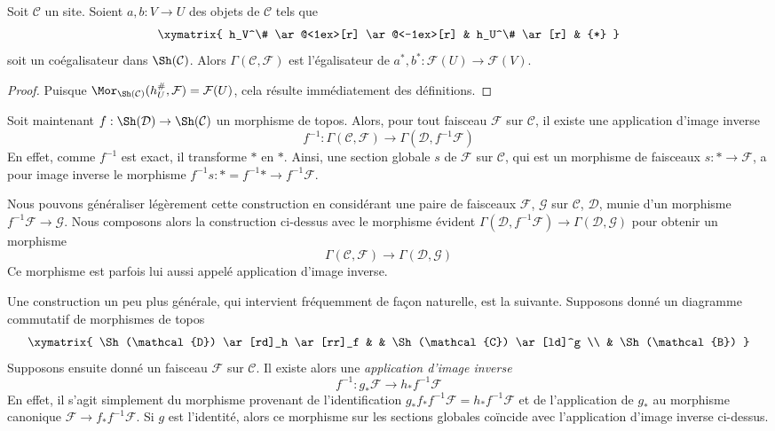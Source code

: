 \begin{lemma}
\label{lemma-compute-global-sections}
Soit $\mathcal{C}$ un site. Soient $a, b : V \to U$ des objets de $\mathcal{C}$
tels que
$$
\xymatrix{
h_V^\# \ar@<1ex>[r] \ar@<-1ex>[r] & h_U^\# \ar[r] & {*}
}
$$
soit un coégalisateur dans $\Sh(\mathcal{C})$. Alors
$\Gamma(\mathcal{C}, \mathcal{F})$ est l'égalisateur de
$a^*, b^* : \mathcal{F}(U) \to \mathcal{F}(V)$.
\end{lemma}

\begin{proof}
Puisque $\Mor_{\Sh(\mathcal{C})}(h_U^\#, \mathcal{F}) = \mathcal{F}(U)$,
cela résulte immédiatement des définitions.
\end{proof}

\noindent
Soit maintenant $f : \Sh(\mathcal{D}) \to \Sh(\mathcal{C})$ un morphisme de topos.
Alors, pour tout faisceau $\mathcal{F}$ sur $\mathcal{C}$, il existe une application d'image inverse
$$
f^{-1} :
\Gamma(\mathcal{C}, \mathcal{F})
\longrightarrow
\Gamma(\mathcal{D}, f^{-1}\mathcal{F})
$$
En effet, comme $f^{-1}$ est exact, il transforme $*$ en $*$. Ainsi, une section
globale $s$ de $\mathcal{F}$ sur $\mathcal{C}$, qui est un morphisme
de faisceaux $s : * \to \mathcal{F}$, a pour image inverse le morphisme
$f^{-1}s : * = f^{-1}* \to f^{-1}\mathcal{F}$.

\medskip\noindent
Nous pouvons généraliser légèrement cette construction en considérant une paire de faisceaux
$\mathcal{F}$, $\mathcal{G}$ sur $\mathcal{C}$, $\mathcal{D}$,
munie d'un morphisme $f^{-1}\mathcal{F} \to \mathcal{G}$. Nous composons alors
la construction ci-dessus avec le morphisme évident
$\Gamma(\mathcal{D}, f^{-1}\mathcal{F}) \to \Gamma(\mathcal{D}, \mathcal{G})$
pour obtenir un morphisme
$$
\Gamma(\mathcal{C}, \mathcal{F})
\longrightarrow
\Gamma(\mathcal{D}, \mathcal{G})
$$
Ce morphisme est parfois lui aussi appelé application d'image inverse.

\medskip\noindent
Une construction un peu plus générale, qui intervient fréquemment de façon naturelle,
est la suivante. Supposons donné un diagramme commutatif de
morphismes de topos
$$
\xymatrix{
\Sh(\mathcal{D}) \ar[rd]_h \ar[rr]_f & &
\Sh(\mathcal{C}) \ar[ld]^g \\
& \Sh(\mathcal{B})
}
$$
Supposons ensuite donné un faisceau $\mathcal{F}$ sur $\mathcal{C}$.
Il existe alors une {\it application d'image inverse}
$$
f^{-1} : g_*\mathcal{F} \longrightarrow h_*f^{-1}\mathcal{F}
$$
En effet, il s'agit simplement du morphisme provenant de l'identification
$g_*f_*f^{-1}\mathcal{F} = h_*f^{-1}\mathcal{F}$ et de
l'application de $g_*$ au morphisme canonique $\mathcal{F} \to f_*f^{-1}\mathcal{F}$.
Si $g$ est l'identité, alors ce morphisme sur les sections globales coïncide
avec l'application d'image inverse ci-dessus.

